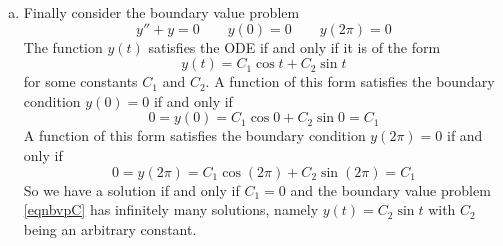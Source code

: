\begin{eg}
\begin{enumerate}[(a)]
\item
Finally consider the boundary value problem
\begin{equation}\label{eqnbvpC}
y''+y=0\qquad y(0)=0\qquad y(2\pi)=0
\end{equation}
The function $y(t)$ satisfies the ODE if and only if it is of the form
\begin{equation*}
y(t)=C_1\cos t+C_2\sin t
\end{equation*} 
for some constants $C_1$ and $C_2$. A function 
of this form satisfies the boundary condition $y(0)=0$ if and only if
\begin{equation*}
0=y(0)= C_1\cos 0+C_2\sin 0 =C_1
\end{equation*}
A function of this form satisfies the boundary condition 
$y(2\pi)=0$ if and  only if
\begin{equation*}
0=y(2\pi)= C_1\cos (2\pi)+C_2\sin(2\pi) =C_1
\end{equation*}
So we have a solution if and only if $C_1=0$ and
the boundary value problem \eqref{eqnbvpC} has infinitely many solutions, namely 
$y(t)=C_2\sin t$ with $C_2$ being an arbitrary constant.


\end{enumerate}
\end{eg}




